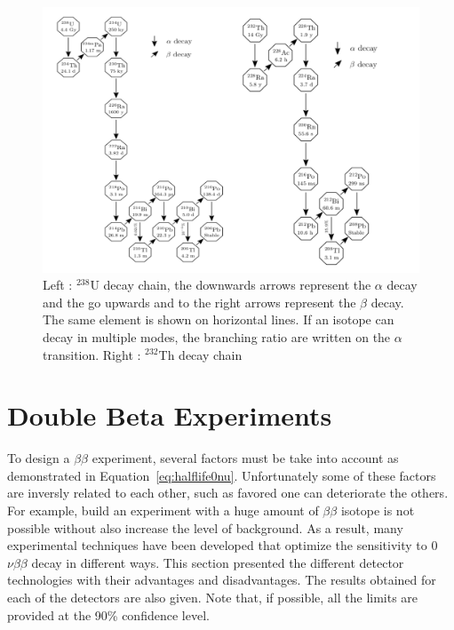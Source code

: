 \documentclass[main.tex]{subfiles}
\begin{document}
\begin{figure}[h!]
\begin{center}
\includegraphics[scale=0.40]{pictures/Chap2/u238-th232decayChain.pdf}
\caption{Left : $^{238}$U decay chain, the downwards arrows represent the $\alpha$ decay and the go upwards and to the right arrows represent the $\beta$ decay. The same element is shown on horizontal lines. If an isotope can decay in multiple modes, the branching ratio are written on the $\alpha$ transition. Right : $^{232}$Th decay chain }
\label{u238-th232decayChain}
\end{center}
\end{figure}


\FloatBarrier


\section{Double Beta Experiments}\label{sec:DBDexperiment}


\NI To design a $\beta\beta$ experiment, several factors must be take into account as demonstrated in Equation~\ref{eq:halflife0nu}. Unfortunately some of these factors are inversly related to each other, such as favored one can deteriorate the others. For example, build an experiment with a huge amount of $\beta\beta$ isotope is not possible without also increase the level of background. As a result, many experimental techniques have been developed that optimize the sensitivity to 0$\nu\beta\beta$ decay in different ways. This section presented the different detector technologies with their advantages and disadvantages. The results obtained for each of the detectors are also given. Note that, if possible, all  the limits are provided at the 90\% confidence level.
\end{document}
